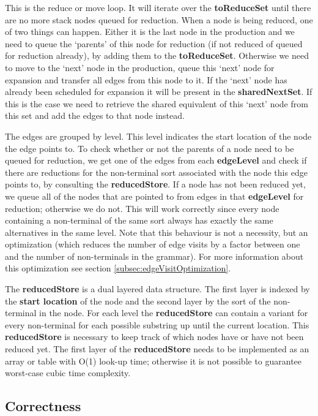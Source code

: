 \documentclass[a4paper,10pt]{article}
\begin{document}
This is the reduce or move loop. It will iterate over the {\bf toReduceSet} until there are no more stack nodes queued for reduction. When a node is being reduced, one of two things can happen. Either it is the last node in the production and we need to queue the `parents' of this node for reduction (if not reduced of queued for reduction already), by adding them to the {\bf toReduceSet}. Otherwise we need to move to the `next' node in the production, queue this `next' node for expansion and transfer all edges from this node to it. If the `next' node has already been scheduled for expansion it will be present in the {\bf sharedNextSet}. If this is the case we need to retrieve the shared equivalent of this `next' node from this set and add the edges to that node instead.

The edges are grouped by level. This level indicates the start location of the node the edge points to. To check whether or not the parents of a node need to be queued for reduction, we get one of the edges from each {\bf edgeLevel} and check if there are reductions for the non-terminal sort associated with the node this edge points to, by consulting the {\bf reducedStore}. If a node has not been reduced yet, we queue all of the nodes that are pointed to from edges in that {\bf edgeLevel} for reduction; otherwise we do not. This will work correctly since every node containing a non-terminal of the same sort always has exactly the same alternatives in the same level. Note that this behaviour is not a necessity, but an optimization (which reduces the number of edge visits by a factor between one and the number of non-terminals in the grammar). For more information about this optimization see section \ref{subsec:edgeVisitOptimization}.

The {\bf reducedStore} is a dual layered data structure. The first layer is indexed by the {\bf start location} of the node and the second layer by the sort of the non-terminal in the node. For each level the {\bf reducedStore} can contain a variant for every non-terminal for each possible substring up until the current location. This {\bf reducedStore} is necessary to keep track of which nodes have or have not been reduced yet. The first layer of the {\bf reducedStore} needs to be implemented as an array or table with O(1) look-up time; otherwise it is not possible to guarantee worst-case cubic time complexity.

\subsection{Correctness}
\end{document}
